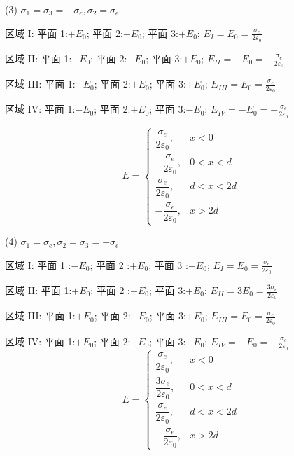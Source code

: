 \documentclass{article}
\begin{document}
\newpage

(3)  $\sigma_1 = \sigma_3 = -\sigma_e,\sigma_2 = \sigma_e$

区域 I:
平面 1:$+E_0$;
平面 2:$-E_0$;
平面 3:$+E_0$;
$E_I =E_0 = \frac{\sigma_e}{2\varepsilon_0}$

区域 II:
平面 1:$-E_0$;
平面 2:$-E_0$;
平面 3:$+E_0$;
$E_{II} =-E_0 = -\frac{\sigma_e}{2\varepsilon_0}$

区域 III:
平面 1:$-E_0$;
平面 2:$+E_0$;
平面 3:$+E_0$;
$E_{III} =E_0 = \frac{\sigma_e}{2\varepsilon_0}$

区域 IV:
平面 1:$-E_0$;
平面 2:$+E_0$;
平面 3:$-E_0$;
$E_{IV}= -E_0 = -\frac{\sigma_e}{2\varepsilon_0}$

$$E =
\begin{cases}
\dfrac{\sigma_e}{2\varepsilon_0}, & x<0 \\[6pt]
-\dfrac{\sigma_e}{2\varepsilon_0}, & 0<x<d \\[6pt]
\dfrac{\sigma_e}{2\varepsilon_0}, & d<x<2d \\[6pt]
-\dfrac{\sigma_e}{2\varepsilon_0}, & x>2d
\end{cases}
$$
 
 (4) $\sigma_1 = \sigma_e,\sigma_2 = \sigma_3 = -\sigma_e$

区域 I:
平面 1 :$-E_0$;
平面 2 :$+E_0$;
平面 3 :$+E_0$;
$E_I =E_0 = \frac{\sigma_e}{2\varepsilon_0}$

 区域 II:
平面 1:$+E_0$;
平面 2 :$+E_0$;
平面 3:$+E_0$;
$E_{II} =3E_0 = \frac{3\sigma_e}{2\varepsilon_0}$

 区域 III:
平面 1:$+E_0$;
平面 2:$-E_0$;
平面 3:$+E_0$;
$E_{III} =E_0 = \frac{\sigma_e}{2\varepsilon_0}$

 区域 IV:
平面 1:$+E_0$;
平面 2:$-E_0$;
平面 3:$-E_0$;
$E_{IV} = -E_0 = -\frac{\sigma_e}{2\varepsilon_0}$
$$
E =
\begin{cases}
\dfrac{\sigma_e}{2\varepsilon_0}, & x<0 \\[6pt]
\dfrac{3\sigma_e}{2\varepsilon_0}, & 0<x<d \\[6pt]
\dfrac{\sigma_e}{2\varepsilon_0}, & d<x<2d \\[6pt]
-\dfrac{\sigma_e}{2\varepsilon_0}, & x>2d
\end{cases}
$$
\end{document}
